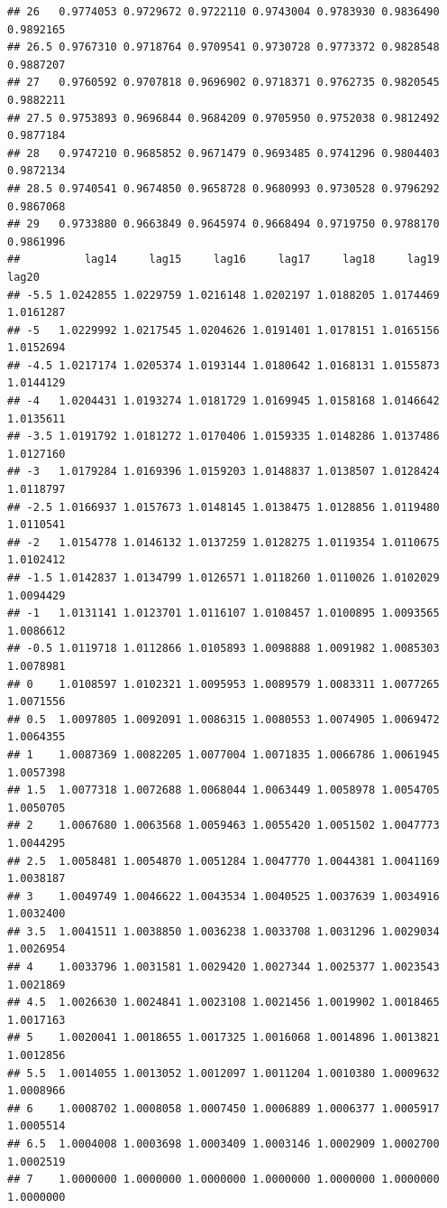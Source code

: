 \documentclass[
]{book}
\begin{document}
\begin{verbatim}
## 26   0.9774053 0.9729672 0.9722110 0.9743004 0.9783930 0.9836490 0.9892165
## 26.5 0.9767310 0.9718764 0.9709541 0.9730728 0.9773372 0.9828548 0.9887207
## 27   0.9760592 0.9707818 0.9696902 0.9718371 0.9762735 0.9820545 0.9882211
## 27.5 0.9753893 0.9696844 0.9684209 0.9705950 0.9752038 0.9812492 0.9877184
## 28   0.9747210 0.9685852 0.9671479 0.9693485 0.9741296 0.9804403 0.9872134
## 28.5 0.9740541 0.9674850 0.9658728 0.9680993 0.9730528 0.9796292 0.9867068
## 29   0.9733880 0.9663849 0.9645974 0.9668494 0.9719750 0.9788170 0.9861996
##          lag14     lag15     lag16     lag17     lag18     lag19     lag20
## -5.5 1.0242855 1.0229759 1.0216148 1.0202197 1.0188205 1.0174469 1.0161287
## -5   1.0229992 1.0217545 1.0204626 1.0191401 1.0178151 1.0165156 1.0152694
## -4.5 1.0217174 1.0205374 1.0193144 1.0180642 1.0168131 1.0155873 1.0144129
## -4   1.0204431 1.0193274 1.0181729 1.0169945 1.0158168 1.0146642 1.0135611
## -3.5 1.0191792 1.0181272 1.0170406 1.0159335 1.0148286 1.0137486 1.0127160
## -3   1.0179284 1.0169396 1.0159203 1.0148837 1.0138507 1.0128424 1.0118797
## -2.5 1.0166937 1.0157673 1.0148145 1.0138475 1.0128856 1.0119480 1.0110541
## -2   1.0154778 1.0146132 1.0137259 1.0128275 1.0119354 1.0110675 1.0102412
## -1.5 1.0142837 1.0134799 1.0126571 1.0118260 1.0110026 1.0102029 1.0094429
## -1   1.0131141 1.0123701 1.0116107 1.0108457 1.0100895 1.0093565 1.0086612
## -0.5 1.0119718 1.0112866 1.0105893 1.0098888 1.0091982 1.0085303 1.0078981
## 0    1.0108597 1.0102321 1.0095953 1.0089579 1.0083311 1.0077265 1.0071556
## 0.5  1.0097805 1.0092091 1.0086315 1.0080553 1.0074905 1.0069472 1.0064355
## 1    1.0087369 1.0082205 1.0077004 1.0071835 1.0066786 1.0061945 1.0057398
## 1.5  1.0077318 1.0072688 1.0068044 1.0063449 1.0058978 1.0054705 1.0050705
## 2    1.0067680 1.0063568 1.0059463 1.0055420 1.0051502 1.0047773 1.0044295
## 2.5  1.0058481 1.0054870 1.0051284 1.0047770 1.0044381 1.0041169 1.0038187
## 3    1.0049749 1.0046622 1.0043534 1.0040525 1.0037639 1.0034916 1.0032400
## 3.5  1.0041511 1.0038850 1.0036238 1.0033708 1.0031296 1.0029034 1.0026954
## 4    1.0033796 1.0031581 1.0029420 1.0027344 1.0025377 1.0023543 1.0021869
## 4.5  1.0026630 1.0024841 1.0023108 1.0021456 1.0019902 1.0018465 1.0017163
## 5    1.0020041 1.0018655 1.0017325 1.0016068 1.0014896 1.0013821 1.0012856
## 5.5  1.0014055 1.0013052 1.0012097 1.0011204 1.0010380 1.0009632 1.0008966
## 6    1.0008702 1.0008058 1.0007450 1.0006889 1.0006377 1.0005917 1.0005514
## 6.5  1.0004008 1.0003698 1.0003409 1.0003146 1.0002909 1.0002700 1.0002519
## 7    1.0000000 1.0000000 1.0000000 1.0000000 1.0000000 1.0000000 1.0000000

\end{verbatim}
\end{document}
